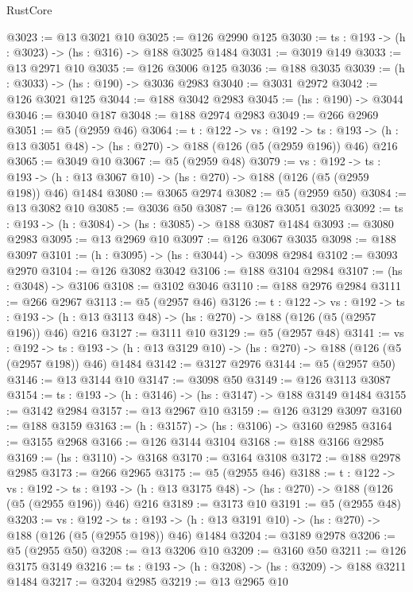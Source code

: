 \begin{lexlean}{RustCore}
\begin{coremodule}
@3023 := @13 @3021 @10
@3025 := @126 @2990 @125
@3030 := {ts : @193} -> (h : @3023) -> (hs : @316) -> @188 @3025 @1484
@3031 := @3019 @149
@3033 := @13 @2971 @10
@3035 := @126 @3006 @125
@3036 := @188 @3035
@3039 := (h : @3033) -> (hs : @190) -> @3036 @2983
@3040 := @3031 @2972
@3042 := @126 @3021 @125
@3044 := @188 @3042 @2983
@3045 := (hs : @190) -> @3044
@3046 := @3040 @187
@3048 := @188 @2974 @2983
@3049 := @266 @2969
@3051 := @5 (@2959 @46)
@3064 := {t : @122} ->
  {vs : @192} ->
  {ts : @193} -> (h : @13 @3051 @48) -> (hs : @270) -> @188 (@126 (@5 (@2959 @196)) @46) @216
@3065 := @3049 @10
@3067 := @5 (@2959 @48)
@3079 := {vs : @192} ->
  {ts : @193} -> (h : @13 @3067 @10) -> (hs : @270) -> @188 (@126 (@5 (@2959 @198)) @46) @1484
@3080 := @3065 @2974
@3082 := @5 (@2959 @50)
@3084 := @13 @3082 @10
@3085 := @3036 @50
@3087 := @126 @3051 @3025
@3092 := {ts : @193} -> (h : @3084) -> (hs : @3085) -> @188 @3087 @1484
@3093 := @3080 @2983
@3095 := @13 @2969 @10
@3097 := @126 @3067 @3035
@3098 := @188 @3097
@3101 := (h : @3095) -> (hs : @3044) -> @3098 @2984
@3102 := @3093 @2970
@3104 := @126 @3082 @3042
@3106 := @188 @3104 @2984
@3107 := (hs : @3048) -> @3106
@3108 := @3102 @3046
@3110 := @188 @2976 @2984
@3111 := @266 @2967
@3113 := @5 (@2957 @46)
@3126 := {t : @122} ->
  {vs : @192} ->
  {ts : @193} -> (h : @13 @3113 @48) -> (hs : @270) -> @188 (@126 (@5 (@2957 @196)) @46) @216
@3127 := @3111 @10
@3129 := @5 (@2957 @48)
@3141 := {vs : @192} ->
  {ts : @193} -> (h : @13 @3129 @10) -> (hs : @270) -> @188 (@126 (@5 (@2957 @198)) @46) @1484
@3142 := @3127 @2976
@3144 := @5 (@2957 @50)
@3146 := @13 @3144 @10
@3147 := @3098 @50
@3149 := @126 @3113 @3087
@3154 := {ts : @193} -> (h : @3146) -> (hs : @3147) -> @188 @3149 @1484
@3155 := @3142 @2984
@3157 := @13 @2967 @10
@3159 := @126 @3129 @3097
@3160 := @188 @3159
@3163 := (h : @3157) -> (hs : @3106) -> @3160 @2985
@3164 := @3155 @2968
@3166 := @126 @3144 @3104
@3168 := @188 @3166 @2985
@3169 := (hs : @3110) -> @3168
@3170 := @3164 @3108
@3172 := @188 @2978 @2985
@3173 := @266 @2965
@3175 := @5 (@2955 @46)
@3188 := {t : @122} ->
  {vs : @192} ->
  {ts : @193} -> (h : @13 @3175 @48) -> (hs : @270) -> @188 (@126 (@5 (@2955 @196)) @46) @216
@3189 := @3173 @10
@3191 := @5 (@2955 @48)
@3203 := {vs : @192} ->
  {ts : @193} -> (h : @13 @3191 @10) -> (hs : @270) -> @188 (@126 (@5 (@2955 @198)) @46) @1484
@3204 := @3189 @2978
@3206 := @5 (@2955 @50)
@3208 := @13 @3206 @10
@3209 := @3160 @50
@3211 := @126 @3175 @3149
@3216 := {ts : @193} -> (h : @3208) -> (hs : @3209) -> @188 @3211 @1484
@3217 := @3204 @2985
@3219 := @13 @2965 @10

\end{coremodule}
\end{lexlean}
